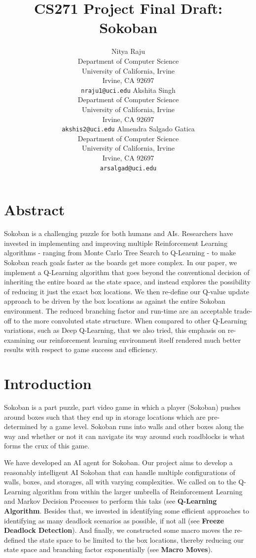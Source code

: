 \documentclass{article}
\title{CS271 Project Final Draft: Sokoban}
\author{
  Nitya Raju\\
  Department of Computer Science\\
  University of California, Irvine\\
  Irvine, CA 92697\\
  \texttt{nraju1@uci.edu} 
   \And
  Akshita Singh \\
  Department of Computer Science\\
  University of California, Irvine\\
  Irvine, CA 92697\\
  \texttt{akshis2@uci.edu} 
   \And
  Almendra Salgado Gatica \\
  Department of Computer Science\\
  University of California, Irvine\\
  Irvine, CA 92697\\
  \texttt{arsalgad@uci.edu} 
}
\begin{document}
\maketitle



\section{Abstract}
Sokoban is a challenging puzzle for both humans and AIs. Researchers have invested in implementing and improving multiple Reinforcement Learning algorithms - ranging from Monte Carlo Tree Search to Q-Learning - to make Sokoban reach goals faster as the boards get more complex. In our paper, we implement a Q-Learning algorithm that goes beyond the conventional decision of inheriting the entire board as the state space, and instead explores the possibility of reducing it just the exact box locations. We then re-define our Q-value update approach to be driven by the box locations as against the entire Sokoban environment. The reduced branching factor and run-time are an acceptable trade-off to the more convoluted state structure. When compared to other Q-Learning variations, such as Deep Q-Learning, that we also tried, this emphasis on re-examining our reinforcement learning environment itself rendered much better results with respect to game success and efficiency. 

\section{Introduction}

Sokoban is a part puzzle, part video game in which a player (Sokoban) pushes around boxes such that they end up in storage locations which are pre-determined by a game level. Sokoban runs into walls and other boxes along the way and whether or not it can navigate its way around such roadblocks is what forms the crux of this game. 

We have developed an AI agent for Sokoban. Our project aims to develop a reasonably intelligent AI Sokoban that can handle multiple configurations of walls, boxes, and storages, all with varying complexities. We called on to the Q-Learning algorithm from within the larger umbrella of Reinforcement Learning and Markov Decision Processes to perform this taks (see \textbf{Q-Learning Algorithm}. Besides that, we invested in identifying some efficient approaches to identifying as many deadlock scenarios as possible, if not all (see \textbf{Freeze Deadlock Detection}). And finally, we constructed some macro moves the re-defined the state space to be limited to the box locations, thereby reducing our state space and branching factor exponentially (see \textbf{Macro Moves}). 
\end{document}
